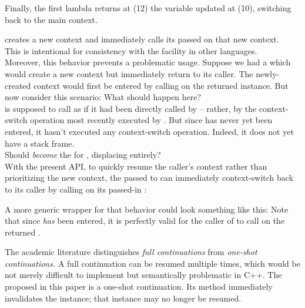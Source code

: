 Finally, the first lambda returns at (12) the  variable updated at
(10), switching back to the main context.



\callcc creates a new context and immediately calls its passed \entryfn on
that new context.\\

This is intentional for consistency with the \cc facility in other
languages.\cite{schemecallcc}\citecomma\cite{rubycallcc}\\

Moreover, this behavior prevents a problematic usage. Suppose we had a
 which would create a new context but immediately
return to its caller. The newly-created context would first be entered by
calling \resume on the returned \cont instance.
But now consider this scenario:
What should happen here?\\

\resumewith is supposed to call  as if it had been
directly called by  -- rather, by the context-switch
operation most recently executed by . But
since  has never yet been entered, it hasn't executed
any context-switch operation. Indeed, it does not yet have a stack frame.\\

Should  \emph{become} the \entryfn
for , displacing  entirely?\\

With the present API, to quickly resume the caller's context rather than
prioritizing the new context, the \entryfn passed to \callcc can immediately
context-switch back to its caller by calling \resume on its passed-in \cont:

A more generic wrapper for that behavior could look something like this:
Note that since  \emph{has} been entered, it
is perfectly valid for the caller of  to
call \resumewith on the returned \cont.



The academic literature distinguishes \emph{full continuations}
from \emph{one-shot continuations.} A full continuation can be resumed
multiple times, which would be not merely difficult to implement but
semantically problematic in C++. The \cont proposed in this paper is a
one-shot continuation. Its \resume method immediately invalidates the
instance; that instance may no longer be resumed.\\

